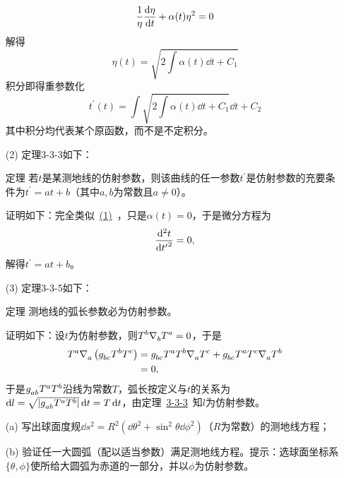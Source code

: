 \begin{xiti}
\begin{zm}
\begin{enumerate}
		    \begin{displaymath}
		    \frac{1}{\eta} \dv{\eta}{t}+\alpha(t) \eta^2=0
		    \end{displaymath}
		    解得\[\eta(t)= \sqrt{2 \int \alpha(t) \dd{t}+C_1 }\]积分即得重参数化\[t^\prime(t)= \int\sqrt{2\int\alpha(t)\dd{t}+C_1}\dd{t}+C_2 \]其中积分均代表某个原函数，而不是不定积分。
		    \item[(2)] 定理3-3-3如下：
		    \begin{yl}{{\heiti 定理}}
		    	\hypertarget{th3-3-3}{}若$t$是某测地线的仿射参数，则该曲线的任一参数$t^\prime $是仿射参数的充要条件为$t^\prime =a t+b $（其中$a,b$为常数且$a\neq 0 $）。
		    \end{yl}
	        证明如下：完全类似~\hyperlink{3.9.1}{(1)}~，只是$\alpha(t)=0 $，于是微分方程为
	        $$ \dv[2]{t}{{t^\prime}}=0, $$解得$t^\prime=a t+b $。
	        \item[(3)] 定理3-3-5如下：
	        \begin{yl}{{\heiti 定理}}
	        	测地线的弧长参数必为仿射参数。
	        \end{yl}
            证明如下：设$t$为仿射参数，则$\displaystyle \tensor{T}{^b} \Nabla{b} \tensor{T}{^a} =0 $，于是
            \begin{align*}
            \tensor{T}{^a} \Nabla{a} \left( \tensor{g}{_b_c} \tensor{T}{^b} \tensor{T}{^c} \right) &=\tensor{g}{_b_c} \tensor{T}{^a} \tensor{T}{^b} \Nabla{a} \tensor{T}{^c} + \tensor{g}{_b_c} \tensor{T}{^a} \tensor{T}{^c} \Nabla{a} \tensor{T}{^b} \\
            &=0,
            \end{align*}
            于是$\tensor{g}{_a_b} \tensor{T}{^a} \tensor{T}{^b} $沿线为常数$T$，弧长按定义与$t$的关系为$ \dd{l} = \sqrt{ \abs{ \tensor{g}{_a_b} \tensor{T}{^a} \tensor{T}{^b} }} \dd{t}=T\dd{t} $，由定理~\hyperlink{th3-3-3}{3-3-3}~知$l$为仿射参数。
		\end{enumerate}
	\end{zm}
	
	\item \begin{enumerate}
		\item[(a)] \hypertarget{2.10}{}写出球面度规$\dd{s}^2=R^2 \left( \dd{\theta}^2 +\sin^2 \theta \dd{\phi}^2 \right) $（$R$为常数）的测地线方程；
		\item[(b)] 验证任一大圆弧（配以适当参数）满足测地线方程。提示：选球面坐标系$\{\theta,\phi \} $使所给大圆弧为赤道的一部分，并以$\phi$为仿射参数。
	\end{enumerate}
    

\end{xiti}
